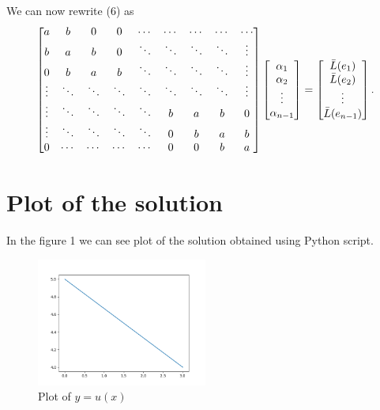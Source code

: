 \documentclass[12pt]{article}
\begin{document}
We can now rewrite (6) as
\begin{equation}
  \begin{bmatrix}
	a & b & 0 & 0 & \cdots & \cdots & \cdots &\cdots & \cdots \\
	b & a & b & 0 & \ddots & \ddots & \ddots & \ddots & \vdots \\
	0 & b & a & b & \ddots & \ddots &  \ddots & \ddots & \vdots \\
	\vdots & \ddots & \ddots & \ddots & \ddots & \ddots & \ddots & \ddots & \vdots \\
	\vdots & \ddots & \ddots & \ddots & \ddots & b & a & b & 0 \\
	\vdots & \ddots & \ddots & \ddots & \ddots & 0 & b & a & b \\
	0 & \cdots & \cdots & \cdots & \cdots & 0 & 0 & b & a
  \end{bmatrix}  
 \*
  \begin{bmatrix}
	\alpha_1 \\
	\alpha_2 \\
	\vdots \\
	\alpha_{n-1} \\
  \end{bmatrix}
=
  \begin{bmatrix}
	\bar L(e_1) \\
	\bar L(e_2) \\
	\vdots \\
	\bar L(e_{n-1}) \\
  \end{bmatrix}.
\end{equation}
 

\section{Plot of the solution}

In the figure 1 we can see plot of the solution obtained using Python script.

\begin{figure}[h]
    \centering
    \includegraphics[width=0.5\textwidth]{plot}
    \caption{Plot of $y=u(x)$}
\end{figure}
\end{document}
